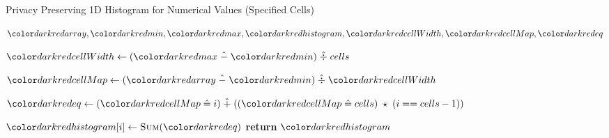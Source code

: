 \begin{algorithm}[H]
\caption{Privacy Preserving 1D Histogram for Numerical Values (Specified Cells)}\label{a:1d-histogram-numerical}
\begin{algorithmic}[1]
\renewcommand{\algorithmicrequire}{\textbf{Private Vars:}}
\Require $\red{array}, \red{min}, \red{max}, \red{histogram}, \red{cellWidth}, \red{cellMap}, \red{eq}$


    \State $\red{cellWidth} \gets (\red{max} \hminus \red{min}) \hdiv cells $

    \State $\red{cellMap} \gets (\red{array} \hminus \red{min}) \hdiv \red{cellWidth} $

        \State $\red{eq} \gets (\red{cellMap} \heq i) \hplus ((\red{cellMap} \heq cells) \hmul (i == cells - 1)) $

        \State $\red{histogram}[i] \gets \textsc{Sum}(\red{eq})$
    \EndFor
    \State \textbf{return} {$\red{histogram}$}
\EndProcedure
\end{algorithmic}
\end{algorithm}
